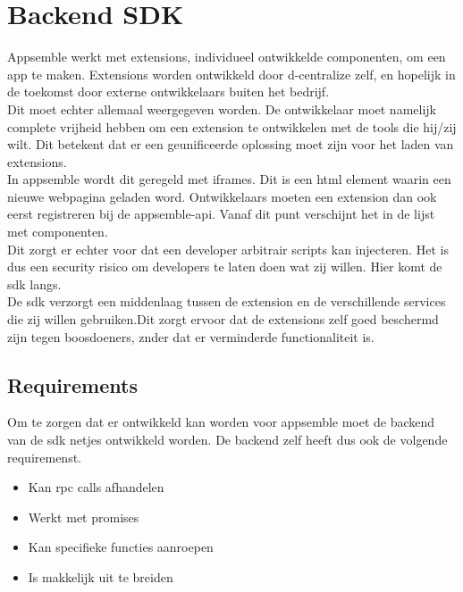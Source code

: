 \chapter{Backend SDK}

Appsemble werkt met extensions, individueel ontwikkelde componenten, om een app te maken. Extensions worden ontwikkeld door d-centralize zelf, en hopelijk in de toekomst door externe ontwikkelaars buiten het bedrijf. \\

Dit moet echter allemaal weergegeven worden. De ontwikkelaar moet namelijk complete vrijheid hebben om een extension te ontwikkelen met de tools die hij/zij wilt. Dit betekent dat er een geunificeerde oplossing moet zijn voor het laden van extensions. \\ 

In appsemble wordt dit geregeld met iframes. Dit is een html element waarin een nieuwe webpagina geladen word. Ontwikkelaars moeten een extension dan ook eerst registreren bij de appsemble-api. Vanaf dit punt verschijnt het in de lijst met componenten. \\

Dit zorgt er echter voor dat een developer arbitrair scripts kan injecteren. Het is dus een security risico om developers te laten doen wat zij willen. Hier komt de sdk langs. \\

De sdk verzorgt een middenlaag tussen de extension en de verschillende services die zij willen gebruiken.Dit zorgt ervoor dat de extensions zelf goed beschermd zijn tegen boosdoeners, znder dat er verminderde functionaliteit is.

\section{Requirements}

Om te zorgen dat er ontwikkeld kan worden voor appsemble moet de backend van de sdk netjes ontwikkeld worden. De backend zelf heeft dus ook de volgende requiremenst.

\begin{itemize}
	\item Kan rpc calls afhandelen
	\item Werkt met promises
	\item Kan specifieke functies aanroepen
	\item Is makkelijk uit te breiden
\end{itemize}

